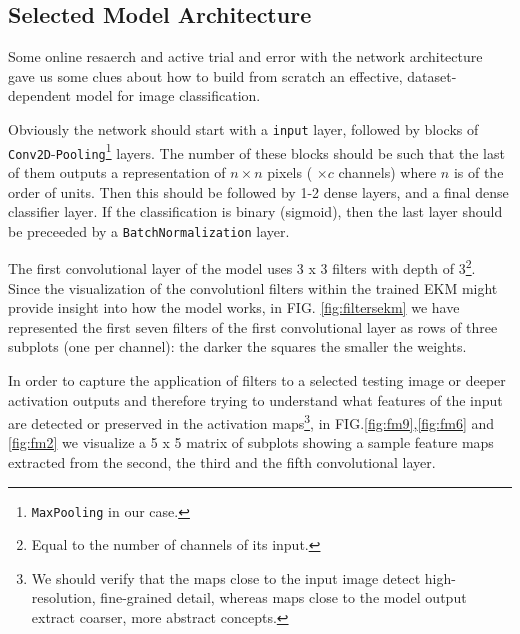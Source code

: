 \documentclass[aps,twocolumn,secnumarabic,nobalancelastpage,amsmath,amssymb,
nofootinbib]{revtex4}
\begin{document}
\subsection{Selected Model Architecture}\label{model-architecture}

Some online resaerch and active trial and error with the network
architecture gave us some clues about how to build from scratch an
effective, dataset-dependent model for image classification. 

Obviously the network should start with a \texttt{input} layer, followed by blocks of \texttt{Conv2D}-\texttt{Pooling}\footnote{\texttt{MaxPooling}
in our case.} layers. The number of these blocks should be such that
the last of them outputs a representation of \(n \times n\) pixels (
\(\times c\) channels) where \(n\) is of the order of units. Then this
should be followed by 1-2 dense layers, and a final dense classifier
layer. If the classification is binary (sigmoid), then the last layer
should be preceeded by a \texttt{BatchNormalization} layer.

The first convolutional layer of the model uses 3 x 3 filters with depth of 3\footnote{Equal to the number of channels of its input.}. Since the visualization of the convolutionl filters within the trained EKM might provide insight into how the model works, in FIG.  \ref{fig:filtersekm} we have represented the first seven filters of the first convolutional layer as rows of three subplots (one per channel): the darker the squares the smaller the weights.

In order to capture the application of filters to a selected testing image or deeper activation outputs and therefore trying to understand what features of the input are detected or preserved in the activation maps\footnote{We should verify that the maps close to the input image
detect high-resolution, fine-grained detail, whereas maps close to the
model output extract coarser, more abstract concepts.}, in FIG.\ref{fig:fm9},\ref{fig:fm6} and \ref{fig:fm2} we visualize a 5 x 5 matrix of subplots showing a sample feature maps extracted from the second, the third and the fifth convolutional layer.
\end{document}
